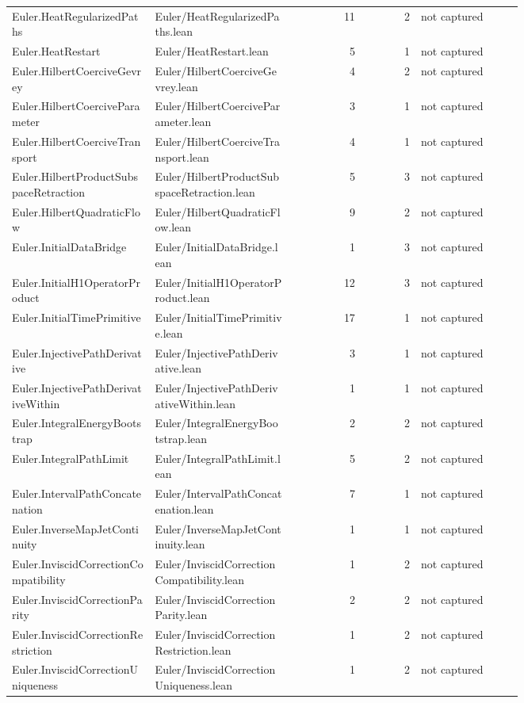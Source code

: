 \documentclass[10pt]{article}
\begin{document}
\begin{longtable}{p{0.28\linewidth}p{0.27\linewidth}r r p{0.20\linewidth}}
Euler.HeatRegularizedPaths & Euler/HeatRegularizedPaths.lean & 11 & 2 & not captured\\
Euler.HeatRestart & Euler/HeatRestart.lean & 5 & 1 & not captured\\
Euler.HilbertCoerciveGevrey & Euler/HilbertCoerciveGevrey.lean & 4 & 2 & not captured\\
Euler.HilbertCoerciveParameter & Euler/HilbertCoerciveParameter.lean & 3 & 1 & not captured\\
Euler.HilbertCoerciveTransport & Euler/HilbertCoerciveTransport.lean & 4 & 1 & not captured\\
Euler.HilbertProductSubspaceRetraction & Euler/HilbertProductSubspaceRetraction.lean & 5 & 3 & not captured\\
Euler.HilbertQuadraticFlow & Euler/HilbertQuadraticFlow.lean & 9 & 2 & not captured\\
Euler.InitialDataBridge & Euler/InitialDataBridge.lean & 1 & 3 & not captured\\
Euler.InitialH1OperatorProduct & Euler/InitialH1OperatorProduct.lean & 12 & 3 & not captured\\
Euler.InitialTimePrimitive & Euler/InitialTimePrimitive.lean & 17 & 1 & not captured\\
Euler.InjectivePathDerivative & Euler/InjectivePathDerivative.lean & 3 & 1 & not captured\\
Euler.InjectivePathDerivativeWithin & Euler/InjectivePathDerivativeWithin.lean & 1 & 1 & not captured\\
Euler.IntegralEnergyBootstrap & Euler/IntegralEnergyBootstrap.lean & 2 & 2 & not captured\\
Euler.IntegralPathLimit & Euler/IntegralPathLimit.lean & 5 & 2 & not captured\\
Euler.IntervalPathConcatenation & Euler/IntervalPathConcatenation.lean & 7 & 1 & not captured\\
Euler.InverseMapJetContinuity & Euler/InverseMapJetContinuity.lean & 1 & 1 & not captured\\
Euler.InviscidCorrectionCompatibility & Euler/InviscidCorrectionCompatibility.lean & 1 & 2 & not captured\\
Euler.InviscidCorrectionParity & Euler/InviscidCorrectionParity.lean & 2 & 2 & not captured\\
Euler.InviscidCorrectionRestriction & Euler/InviscidCorrectionRestriction.lean & 1 & 2 & not captured\\
Euler.InviscidCorrectionUniqueness & Euler/InviscidCorrectionUniqueness.lean & 1 & 2 & not captured\\

\end{longtable}
\end{document}
